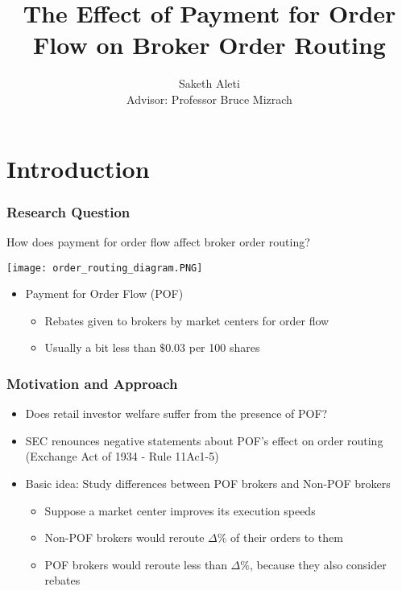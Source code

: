 \documentclass[11pt]{beamer}
\begin{document}
	\author{Saketh Aleti \\ Advisor: Professor Bruce Mizrach}
	\title{The Effect of Payment for Order Flow on Broker Order Routing}
	\subject{}
	\begin{frame}[plain]
	\maketitle
\end{frame}

\section{Introduction}

\begin{frame}
\frametitle{Research Question}

	\begin{block}
		{How does payment for order flow affect broker order routing?}	
	\end{block}

	\centerline{\texttt{[image: order\_routing\_diagram.PNG]}}
	\vspace{-1em}
	\begin{itemize}
		\item Payment for Order Flow (POF)
		\begin{itemize}
			\item Rebates given to brokers by market centers for order flow
			\item Usually a bit less than $\$0.03$ per 100 shares
		\end{itemize}
	\end{itemize}

\end{frame}

\begin{frame}
\frametitle{Motivation and Approach}

\begin{itemize}
	\setlength\itemsep{1em}
	\item Does retail investor welfare suffer from the presence of POF?
	
	\item SEC renounces negative statements about POF's effect on order routing  (Exchange Act of 1934 - Rule 11Ac1-5)

	\item Basic idea: Study differences between POF brokers and Non-POF brokers
	\begin{itemize}
		\setlength\itemsep{0.5em}
		\item Suppose a market center improves its execution speeds
		\item Non-POF brokers would reroute $\Delta\%$ of their orders to them
		\item POF brokers would reroute less than $\Delta\%$, because they also consider rebates
	\end{itemize}

\end{itemize}

\end{frame}
\end{document}
